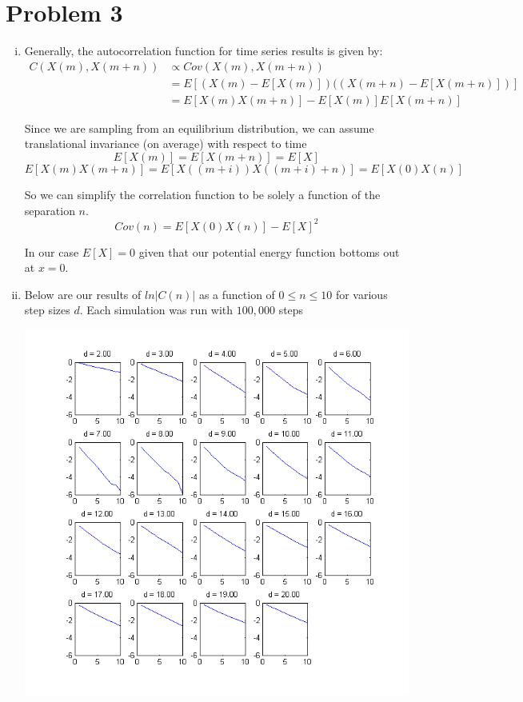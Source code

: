 \documentclass{article}
\begin{document}
\section*{Problem 3}
\begin{enumerate}[i.]
  \item Generally, the autocorrelation function for time series results is given by:
    \begin{align}
      C(X(m), X(m+n)) &\propto Cov(X(m), X(m+n)) \\
      &= E\left[ (X(m) - E\left[ X(m) \right]) ((X(m+n) - E\left[ X(m+n) \right])\right]\\
      &= E\left[ X(m) X(m+n)\right] - E\left[X(m)\right] E\left[X(m+n) \right]
    \end{align}

    Since we are sampling from an equilibrium distribution, we can assume translational invariance (on average) with respect to time
    $$E\left[X(m)\right] = E\left[X(m+n)\right] = E\left[X\right]$$
    $$E\left[X(m)X(m+n)\right] = E\left[X((m+i))X((m+i)+n)\right] = E\left[ X(0) X(n)\right]$$

    So we can simplify the correlation function to be solely a function of the separation $n$.
    $$Cov(n) = E\left[ X(0) X(n)\right] - E\left[X\right]^2$$

    In our case $E\left[X \right] = 0$ given that our potential energy function bottoms out at $x=0$. 

  \item Below are our results of $ln|C(n)|$ as a function of $0 \leq n \leq 10$ for various step sizes $d$. Each simulation was run with $100,000$ steps\\
    \begin{center}
      \includegraphics[scale=0.7]{prob3b}
    \end{center}


\end{enumerate}
\end{document}
